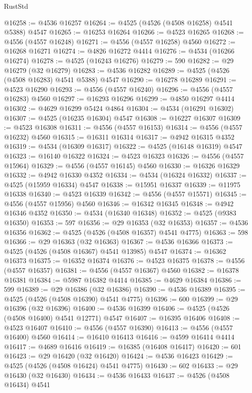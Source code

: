 \begin{lexlean}{RustStd}
\begin{coremodule}
{\begin{coremodule}
{{{{{{{{{{{{{{{{{{{{{{{{{{{{{{{{{{{{{{{{{{{{{{{{{{{{{{{@16258 := @4536 @16257
@16264 := @4525 (@4526 (@4508 @16258) @4541 @5388) @4547
@16265 := @16253 @16264
@16266 := @4523 @16265
@16268 := @4556 (@4557 @16248)
@16271 := @4556 (@4557 @16258) @4560
@16272 := @16268 @16271
@16274 := @4826 @16272 @4414
@16276 := @4534 (@16266 @16274)
@16278 := @4525 (@16243 @16276)
@16279 := 590
@16282 := @29 @16279 (@32 @16279)
@16283 := @4536 @16282
@16289 := @4525 (@4526 (@4508 @16283) @4541 @5388) @4547
@16290 := @16278 @16289
@16291 := @4523 @16290
@16293 := @4556 (@4557 @16240)
@16296 := @4556 (@4557 @16283) @4560
@16297 := @16293 @16296
@16299 := @4850 @16297 @4414
@16302 := @4629 @16299 @5424 @4864
@16304 := @4534 (@16291 @16302)
@16307 := @4525 (@16235 @16304) @4547
@16308 := @16227 @16307
@16309 := @4523 @16308
@16311 := @4556 (@4557 @16153)
@16314 := @4556 (@4557 @16232) @4560
@16315 := @16311 @16314
@16317 := @4942 @16315 @4352
@16319 := @4534 (@16309 @16317)
@16322 := @4525 (@16148 @16319) @4547
@16323 := @16140 @16322
@16324 := @4523 @16323
@16326 := @4556 (@4557 @15964)
@16329 := @4556 (@4557 @16145) @4560
@16330 := @16326 @16329
@16332 := @4942 @16330 @4352
@16334 := @4534 (@16324 @16332)
@16337 := @4525 (@15959 @16334) @4547
@16338 := @15951 @16337
@16339 := @11975 @16338
@16340 := @4523 @16339
@16342 := @4556 (@4557 @15571)
@16345 := @4556 (@4557 @15956) @4560
@16346 := @16342 @16345
@16348 := @4942 @16346 @4352
@16350 := @4534 (@16340 @16348)
@16352 := @4525 (@9383 @16350)
@16353 := 597
@16356 := @29 @16353 (@32 @16353)
@16357 := @4536 @16356
@16362 := @4525 (@4526 (@4508 @16357) @4541 @4775)
@16363 := 598
@16366 := @29 @16363 (@32 @16363)
@16367 := @4536 @16366
@16373 := @4525 (@4526 (@4508 @16367) @4541 @13985) @4547
@16374 := @16362 @16373
@16375 := @16352 @16374
@16376 := @4523 @16375
@16378 := @4556 (@4557 @16357)
@16381 := @4556 (@4557 @16367) @4560
@16382 := @16378 @16381
@16384 := @5987 @16382 @4414
@16385 := @4629 @16384
@16386 := 599
@16389 := @29 @16386 (@32 @16386)
@16390 := @4536 @16389
@16395 := @4525 (@4526 (@4508 @16390) @4541 @4775)
@16396 := 600
@16399 := @29 @16396 (@32 @16396)
@16400 := @4536 @16399
@16406 := @4525 (@4526 (@4508 @16400) @4541 @12771) @4547
@16407 := @16395 @16406
@16408 := @4523 @16407
@16410 := @4556 (@4557 @16390)
@16413 := @4556 (@4557 @16400) @4560
@16414 := @16410 @16413
@16416 := @4599 @16414 @4414
@16417 := @4689 @16416
@16419 := @16385 (@16408 @16417)
@16420 := 601
@16423 := @29 @16420 (@32 @16420)
@16424 := @4536 @16423
@16429 := @4525 (@4526 (@4508 @16424) @4541 @4775)
@16430 := 602
@16433 := @29 @16430 (@32 @16430)
@16434 := @4536 @16433
@16437 := @4526 (@4508 @16434) @4541
}}}}}}}}}}}}}}}}}}}}}}}}}}}}}}}}}}}}}}}}}}}}}}}}}}}}}}}
\end{coremodule}}
\end{coremodule}
\end{lexlean}
